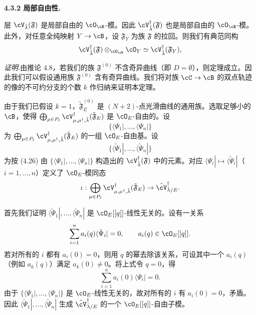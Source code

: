\noindent\textbf{4.3.2 局部自由性.}\quad

\begin{theorem}[4.19]
 层 $\cV_{\tilde\lambda}(\mathfrak F)$ 是局部自由的 $\cO_\cB$-模。因此
 $\cV^\dagger_{\tilde\lambda}(\mathfrak F)$ 也是局部自由的 $\cO_\cB$-模。此外，对任意全纯映射
 $Y\to\cB$，设 $\mathfrak F_Y$ 为族 $\mathfrak F$ 的拉回。则我们有典范同构
 \[
  \cV^\dagger_{\tilde\lambda}(\mathfrak F)\otimes_{\cO_\cB}\cO_Y
  \simeq\cV^\dagger_{\tilde\lambda}(\mathfrak F_Y),
 \]
\end{theorem}

\noindent\textit{证明.}\quad 由推论 4.8，若我们的族 $\mathfrak F^{(0)}$ 不含奇异曲线（即 $D=\emptyset$），则定理成立。因此我们可以假设通用族 $\mathfrak F^{(0)}$ 含有奇异曲线。我们将对族 $\cC\to\cB$ 的双点轨迹的像的不可约分支的个数 $k$ 作归纳来证明本定理。


由于我们已假设 $k=1$，$\tilde{\mathfrak F}^{(0)}_E$ 是 $(N+2)$-点光滑曲线的通用族。选取足够小的 $\cB$，使得 $\bigoplus_{\mu\in P_\ell}\cV^\dagger_{\mu,\mu^\dagger,\tilde\lambda}(\tilde{\mathfrak F}_E)$ 是 $\cO_E$-自由的。设
\[
 \{\langle\Psi_1|,\dots,\langle\Psi_n|\}
\]
为 $\bigoplus_{\mu\in P_\ell}\cV^\dagger_{\mu,\mu^\dagger,\tilde\lambda}(\tilde{\mathfrak F}_E)$ 的一组 $\cO_E$-自由基。设
\[
 \{\langle\tilde\Psi_1|,\dots,\langle\tilde\Psi_n|\}
\]
为按 (4.26) 由 $\{\langle\Psi_1|,\dots,\langle\Psi_n|\}$ 构造出的 $\cV^\dagger_{\tilde\lambda}(\mathfrak F)$ 中的元素。对应 $\langle\Psi_i|\mapsto\langle\tilde\Psi_i|$（$i=1,\dots,n$）定义了 $\cO_E$-模同态
\[
 \iota:\bigoplus_{\mu\in P_\ell}\cV^\dagger_{\mu,\mu^\dagger,\tilde\lambda}(\tilde{\mathfrak F}_E)
 \to\hat\cV^\dagger_{\tilde\lambda/E}.
\]

首先我们证明 $\langle\tilde\Psi_1|,\dots,\langle\tilde\Psi_n|$ 是 $\cO_E[[q]]$-线性无关的。设有一关系
\[
 \sum_{i=1}^{n}a_i(q)\langle\tilde\Psi_i|=0,\qquad a_i(q)\in\cO_E[[q]].
\]
若对所有的 $i$ 都有 $a_i(0)=0$，则用 $q$ 的幂去除该关系，可设其中一个 $a_i(q)$（例如 $a_k(q)$）满足 $a_k(0)\ne0$。将上式令 $q=0$，得
\[
 \sum_{i=1}^{n}a_i(0)\langle\Psi_i|=0.
\]
由于 $\{\langle\Psi_1|,\dots,\langle\Psi_n|\}$ 是 $\cO_E$-线性无关的，故对所有的 $i$ 有 $a_i(0)=0$，矛盾。因此 $\langle\tilde\Psi_1|,\dots,\langle\tilde\Psi_n|$ 生成 $\hat\cV^\dagger_{\tilde\lambda/E}$ 的一个 $\cO_E[[q]]$-自由子模。



